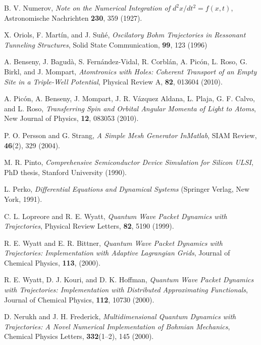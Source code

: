\documentclass[onecolumn,nofootinbib, secnumarabic, amsmath, nobibnotes,11pt,aps,pra]{revtex4-1}
\begin{document}
\begin{thebibliography}{999}
B. V. Numerov, \emph{Note on the Numerical Integration of $d^2 x/dt^2 = f(x,t)$}, Astronomische Nachrichten \textbf{230},  359 (1927).

X. Oriols, F. Mart\'{i}n, and J. Su\~{n}\'{e}, \emph{Oscilatory Bohm Trajectories in Ressonant Tunneling Structures}, Solid State Communication, \textbf{99},  123 (1996)

A. Benseny, J. Bagud\` {a}, S. Fern\'{a}ndez-Vidal, R. Corbl\'{a}n, A. Pic\'{o}n, L. Roso, G. Birkl, and J. Mompart, \emph{Atomtronics with Holes: Coherent Transport of an Empty Site in a Triple-Well Potential}, Physical Review A, \textbf{82},  013604 (2010).

A. Pic\'{o}n, A. Benseny, J. Mompart, J. R. V\'{a}zquez Aldana, L. Plaja, G. F. Calvo, and L. Roso, \emph{Transferring Spin and Orbital Angular Momenta of Light to Atoms}, New Journal of Physics, \textbf{12},  083053 (2010).

P. O. Persson and G. Strang, \emph{A Simple Mesh Generator InMatlab}, SIAM Review, \textbf{46}(2),  329 (2004).

M. R. Pinto, \emph{Comprehensive Semiconductor Device Simulation for Silicon ULSI}, PhD thesis, Stanford University (1990).

L. Perko, \emph{Differential Equations and Dynamical Systems} (Springer Verlag, New York, 1991).

C. L. Lopreore and R. E. Wyatt, \emph{Quantum Wave Packet Dynamics with Trajectories}, Physical Review Letters, \textbf{82},  5190 (1999).

R. E. Wyatt and E. R. Bittner, \emph{Quantum Wave Packet Dynamics with Trajectories: Implementation with Adaptive Lagrangian Grids}, Journal of Chemical Physics, \textbf{113},  (2000).

R. E. Wyatt, D. J. Kouri, and D. K. Hoffman, \emph{Quantum Wave Packet Dynamics with Trajectories: Implementation with Distributed Approximating Functionals}, Journal of Chemical Physics, \textbf{112},  10730 (2000).

D. Nerukh and J. H. Frederick, \emph{Multidimensional Quantum Dynamics with Trajectories: A Novel Numerical Implementation of
Bohmian Mechanics}, Chemical Physics Letters, \textbf{332}(1--2),  145 (2000).


\end{thebibliography}
\end{document}
